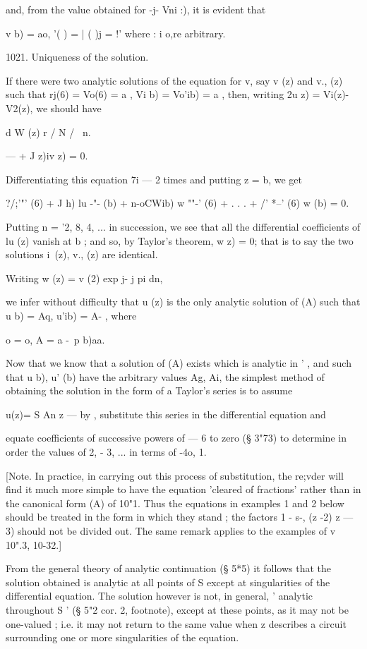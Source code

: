 and, from the value obtained for -j- Vni :), it is evident that

v b) = ao, '( ) = | ( )j = !' where : i o,re arbitrary.

1021. Uniqueness of the solution.

If there were two analytic solutions of the equation for v, say v (z)
and v., (z) such that rj(6) = Vo(6) = a , Vi b) = Vo'ib) = a , then,
writing 2u z) = Vi(z)-V2(z), we should have

d W (z) r / N / \ n.

— + J z)iv z) = 0.

Differentiating this equation 7i — 2 times and putting z = b, we get

?/;'"' (6) + J h) lu -"- (b) + n-oCWib) w ""-' (6) + . . . + /' *--'
(6) w (b) = 0.

Putting n = '2, 8, 4, ... in succession, we see that all the
differential coefficients of lu (z) vanish at b ; and so, by Taylor's
theorem, w z) = 0; that is to say the two solutions i\ (z), v., (z)
are identical.



Writing w (z) = v (2) exp j- j pi dn,



we infer without difficulty that u (z) is the only analytic solution
of (A) such that u b) = Aq, u'ib) = A- , where

 o = o, A = a -\ p b)aa.

Now that we know that a solution of (A) exists which is analytic in '
, and such that u b), u' (b) have the arbitrary values Ag, Ai, the
simplest method of obtaining the solution in the form of a Taylor's
series is to assume

u(z)= S An z — by , substitute this series in the differential
equation and

equate coefficients of successive powers of — 6 to zero (§ 3"73) to
determine in order the values of 2, - 3, ... in terms of -4o, 1.

[Note. In practice, in carrying out this process of substitution, the
re;vder will find it much more simple to have the equation 'cleared of
fractions' rather than in the canonical form (A) of 10"1. Thus the
equations in examples 1 and 2 below should be treated in the form in
which they stand ; the factors 1 - s-, (z -2) z — 3) should not be
divided out. The same remark applies to the examples of v 10".3,
10-32.]

From the general theory of analytic continuation (§ 5*5) it follows
that the solution obtained is analytic at all points of S except at
singularities of the differential equation. The solution however is
not, in general, ' analytic throughout S ' (§ 5"2 cor. 2, footnote),
except at these points, as it may not be one-valued ; i.e. it may not
return to the same value when z describes a circuit surrounding one or
more singularities of the equation.



